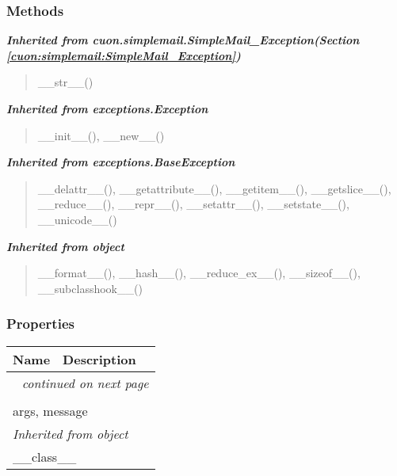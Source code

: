   \subsubsection{Methods}


\large{\textbf{\textit{Inherited from cuon.simplemail.SimpleMail\_Exception\textit{(Section \ref{cuon:simplemail:SimpleMail_Exception})}}}}

\begin{quote}
\_\_str\_\_()
\end{quote}

\large{\textbf{\textit{Inherited from exceptions.Exception}}}

\begin{quote}
\_\_init\_\_(), \_\_new\_\_()
\end{quote}

\large{\textbf{\textit{Inherited from exceptions.BaseException}}}

\begin{quote}
\_\_delattr\_\_(), \_\_getattribute\_\_(), \_\_getitem\_\_(), \_\_getslice\_\_(), \_\_reduce\_\_(), \_\_repr\_\_(), \_\_setattr\_\_(), \_\_setstate\_\_(), \_\_unicode\_\_()
\end{quote}

\large{\textbf{\textit{Inherited from object}}}

\begin{quote}
\_\_format\_\_(), \_\_hash\_\_(), \_\_reduce\_ex\_\_(), \_\_sizeof\_\_(), \_\_subclasshook\_\_()
\end{quote}


  \subsubsection{Properties}

    \vspace{-1cm}
\hspace{\varindent}\begin{longtable}{|p{\varnamewidth}|p{\vardescrwidth}|l}
\cline{1-2}
\cline{1-2} \centering \textbf{Name} & \centering \textbf{Description}& \\
\cline{1-2}
\endhead\cline{1-2}\multicolumn{3}{r}{\small\textit{continued on next page}}\\\endfoot\cline{1-2}
\endlastfoot\multicolumn{2}{|l|}{\textit{Inherited from exceptions.BaseException}}\\
\multicolumn{2}{|p{\varwidth}|}{\raggedright args, message}\\
\cline{1-2}
\multicolumn{2}{|l|}{\textit{Inherited from object}}\\
\multicolumn{2}{|p{\varwidth}|}{\raggedright \_\_class\_\_}\\
\cline{1-2}
\end{longtable}

